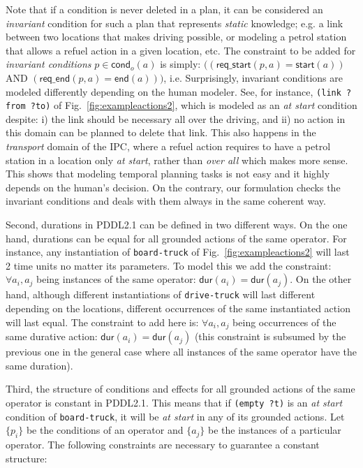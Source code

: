 \documentclass{ecai}
\newcommand{\cond}{\mathsf{cond}}  %
\newcommand{\dur}{\mathsf{dur}}    %
\newcommand{\start}{\mathsf{start}}%
\newcommand{\en}{\mathsf{end}}     %
\newcommand{\reqs}{\mathsf{req\_{start}}} %
\newcommand{\reqe}{\mathsf{req\_{end}}}   %
\begin{document}
Note that if a condition is never deleted in a plan, it can be considered an {\em invariant} condition for such a plan that represents {\em static} knowledge; e.g. a link between two locations that makes driving possible, or modeling a petrol station that allows a refuel action in a given location, etc. The constraint to be added for {\em invariant conditions} $p \in \cond_o(a)$ is simply: $((\reqs(p,a) = \start(a))$ AND $(\reqe(p,a) = \en(a)))$, i.e. Surprisingly, invariant conditions are modeled differently depending on the human modeler. See, for instance, \texttt{(link ?from ?to)} of Fig.~\ref{fig:exampleactions2}, which is modeled as an \emph{at start} condition despite: i) the link should be necessary all over the driving, and ii) no action in this domain can be planned to delete that link.
This also happens in the \emph{transport} domain of the IPC, where a refuel action requires to have a petrol station in a location only \emph{at start}, rather than \emph{over all} which makes more sense. This shows that modeling temporal planning tasks is not easy and it highly depends on the human's decision. On the contrary, our formulation checks the invariant conditions and deals with them always in the same coherent way.

Second, durations in PDDL2.1 can be defined in two different ways. On the one hand, durations can be equal for all grounded actions of the same operator. For instance, any instantiation of \texttt{board-truck} of Fig.~\ref{fig:exampleactions2} will last 2 time units no matter its parameters. To model this we add the constraint: $\forall a_i,a_j$ being instances of the same operator: $\dur(a_i) = \dur(a_j)$. On the other hand, although different instantiations of \texttt{drive-truck} will last different depending on the locations, different occurrences of the same instantiated action will last equal. The constraint to add here is: $\forall a_i,a_j$ being occurrences of the same durative action: $\dur(a_i) = \dur(a_j)$ (this constraint is subsumed by the previous one in the general case where all instances of the same operator have the same duration).

Third, the structure of conditions and effects for all grounded actions of the same operator is constant in PDDL2.1. This means that if \texttt{(empty ?t)} is an \emph{at start} condition of \texttt{board-truck}, it will be \emph{at start} in any of its grounded actions.
Let $\{p_i\}$ be the conditions of an operator and $\{a_j\}$ be the instances of a particular operator. The following constraints are necessary to guarantee a constant structure:
\end{document}
